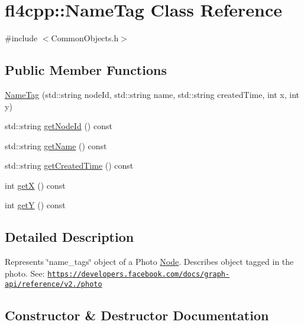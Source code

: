 \hypertarget{classfl4cpp_1_1_name_tag}{}\section{fl4cpp\+:\+:Name\+Tag Class Reference}
\label{classfl4cpp_1_1_name_tag}


{\ttfamily \#include $<$Common\+Objects.\+h$>$}

\subsection*{Public Member Functions}
\begin{DoxyCompactItemize}
\item 
\hyperlink{classfl4cpp_1_1_name_tag_a3a00bf01e9fadeadb82e81d174101a82}{Name\+Tag} (std\+::string node\+Id, std\+::string name, std\+::string created\+Time, int x, int y)
\item 
std\+::string \hyperlink{classfl4cpp_1_1_name_tag_ad6877a00cbe5dd13c6c9fed45bf1b6d2}{get\+Node\+Id} () const 
\item 
std\+::string \hyperlink{classfl4cpp_1_1_name_tag_a25049b72b03631b636c318011fbc384d}{get\+Name} () const 
\item 
std\+::string \hyperlink{classfl4cpp_1_1_name_tag_aea8927ad73449aa11e597b29881e7bff}{get\+Created\+Time} () const 
\item 
int \hyperlink{classfl4cpp_1_1_name_tag_afc40813604a6419c3d7efd15e18ab144}{getX} () const 
\item 
int \hyperlink{classfl4cpp_1_1_name_tag_ae186af61111e5253c847898a416ab963}{getY} () const 
\end{DoxyCompactItemize}


\subsection{Detailed Description}
Represents \char`\"{}name\+\_\+tags\char`\"{} object of a Photo \hyperlink{classfl4cpp_1_1_node}{Node}. Describes object tagged in the photo. See\+: \href{https://developers.facebook.com/docs/graph-api/reference/v2.0/photo}{\tt https\+://developers.\+facebook.\+com/docs/graph-\/api/reference/v2./photo} 

\subsection{Constructor \& Destructor Documentation}

